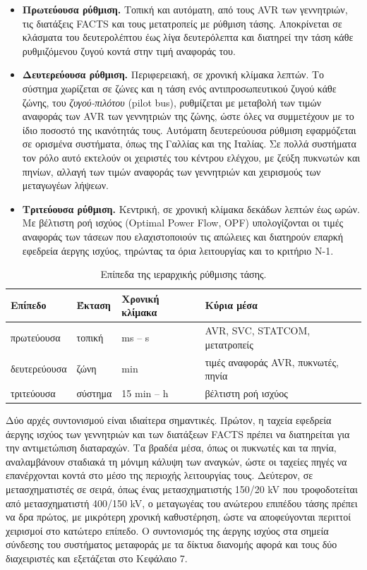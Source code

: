 \begin{itemize}
\item \textbf{Πρωτεύουσα ρύθμιση.} Τοπική και αυτόματη, από τους AVR των γεννητριών, τις
      διατάξεις FACTS και τους μετατροπείς με ρύθμιση τάσης. Αποκρίνεται σε κλάσματα του
      δευτερολέπτου έως λίγα δευτερόλεπτα και διατηρεί την τάση κάθε ρυθμιζόμενου ζυγού κοντά
      στην τιμή αναφοράς του.
\item \textbf{Δευτερεύουσα ρύθμιση.} Περιφερειακή, σε χρονική κλίμακα λεπτών. Το σύστημα
      χωρίζεται σε ζώνες και η τάση ενός αντιπροσωπευτικού ζυγού κάθε ζώνης, του
      \emph{ζυγού-πιλότου} (pilot bus), ρυθμίζεται με μεταβολή των τιμών αναφοράς των AVR των
      γεννητριών της ζώνης, ώστε όλες να συμμετέχουν με το ίδιο ποσοστό της ικανότητάς τους.
      Αυτόματη δευτερεύουσα ρύθμιση εφαρμόζεται σε ορισμένα συστήματα, όπως της Γαλλίας και
      της Ιταλίας. Σε πολλά συστήματα τον ρόλο αυτό εκτελούν οι χειριστές του κέντρου ελέγχου,
      με ζεύξη πυκνωτών και πηνίων, αλλαγή των τιμών αναφοράς των γεννητριών και χειρισμούς
      των μεταγωγέων λήψεων.
\item \textbf{Τριτεύουσα ρύθμιση.} Κεντρική, σε χρονική κλίμακα δεκάδων λεπτών έως ωρών. Με
      βέλτιστη ροή ισχύος (Optimal Power Flow, OPF) υπολογίζονται οι τιμές αναφοράς των
      τάσεων που ελαχιστοποιούν τις απώλειες και διατηρούν επαρκή εφεδρεία άεργης ισχύος,
      τηρώντας τα όρια λειτουργίας και το κριτήριο N-1.
\end{itemize}

\begin{table}[!htbp]
\centering
\begin{tabular}{llll}
\hline
Επίπεδο & Έκταση & Χρονική κλίμακα & Κύρια μέσα \\
\hline
πρωτεύουσα   & τοπική  & ms -- s     & AVR, SVC, STATCOM, μετατροπείς \\
δευτερεύουσα & ζώνη    & min         & τιμές αναφοράς AVR, πυκνωτές, πηνία \\
τριτεύουσα   & σύστημα & 15 min -- h & βέλτιστη ροή ισχύος \\
\hline
\end{tabular}
\caption{Επίπεδα της ιεραρχικής ρύθμισης τάσης.}
\label{tab:v-hier}
\end{table}

Δύο αρχές συντονισμού είναι ιδιαίτερα σημαντικές. Πρώτον, η ταχεία εφεδρεία άεργης ισχύος των
γεννητριών και των διατάξεων FACTS πρέπει να διατηρείται για την αντιμετώπιση διαταραχών. Τα
βραδέα μέσα, όπως οι πυκνωτές και τα πηνία, αναλαμβάνουν σταδιακά τη μόνιμη κάλυψη των αναγκών,
ώστε οι ταχείες πηγές να επανέρχονται κοντά στο μέσο της περιοχής λειτουργίας τους. Δεύτερον,
σε μετασχηματιστές σε σειρά, όπως ένας μετασχηματιστής 150/20 kV που τροφοδοτείται από
μετασχηματιστή 400/150 kV, ο μεταγωγέας του ανώτερου επιπέδου τάσης πρέπει να δρα πρώτος, με
μικρότερη χρονική καθυστέρηση, ώστε να αποφεύγονται περιττοί χειρισμοί στο κατώτερο επίπεδο. Ο
συντονισμός της άεργης ισχύος στα σημεία σύνδεσης του συστήματος μεταφοράς με τα δίκτυα
διανομής αφορά και τους δύο διαχειριστές και εξετάζεται στο Κεφάλαιο 7.

